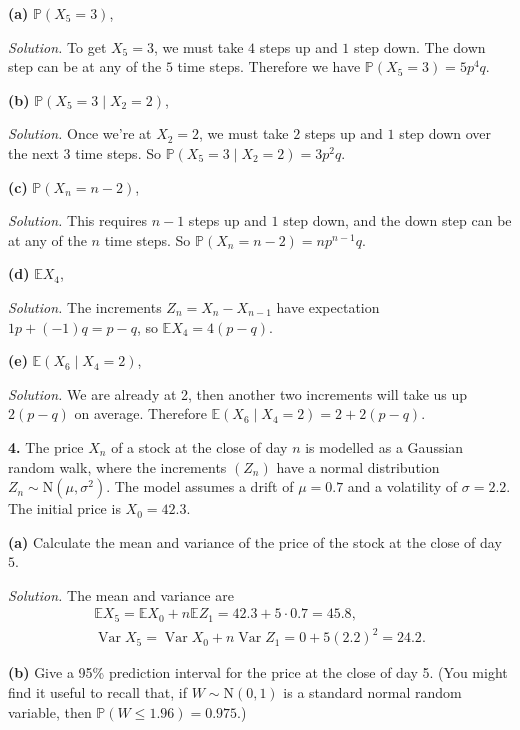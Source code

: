 \documentclass[
  a4paper,
]{article}
\theoremstyle{definition}
\theoremstyle{definition}
\theoremstyle{definition}
\theoremstyle{remark}
\begin{document}
\textbf{(a)} \(\mathbb P(X_5 = 3)\),

\emph{Solution.} To get \(X_5 = 3\), we must take \(4\) steps up and \(1\) step down. The down step can be at any of the \(5\) time steps. Therefore we have \(\mathbb P(X_5 = 3) = 5p^4q\).

\textbf{(b)} \(\mathbb P(X_5 = 3 \mid X_2 = 2)\),

\emph{Solution.} Once we're at \(X_2 = 2\), we must take \(2\) steps up and \(1\) step down over the next \(3\) time steps. So \(\mathbb P(X_5 = 3 \mid X_2 = 2) = 3p^2q\).

\textbf{(c)} \(\mathbb P(X_n = n-2)\),

\emph{Solution.} This requires \(n-1\) steps up and \(1\) step down, and the down step can be at any of the \(n\) time steps. So \(\mathbb P(X_n = n-2) = np^{n-1}q\).

\textbf{(d)} \(\mathbb E X_4\),

\emph{Solution.} The increments \(Z_n = X_n - X_{n-1}\) have expectation \(1p + (-1)q = p - q\), so \(\mathbb E X_4 = 4(p-q)\).

\textbf{(e)} \(\mathbb E(X_6 \mid X_4 = 2)\),

\emph{Solution.} We are already at 2, then another two increments will take us up \(2(p-q)\) on average. Therefore \(\mathbb E(X_6 \mid X_4 = 2) = 2 + 2(p-q)\).

\textbf{4.} The price \(X_n\) of a stock at the close of day \(n\) is modelled as a Gaussian random walk, where the increments \((Z_n)\) have a normal distribution \(Z_n \sim \text{N}(\mu, \sigma^2)\). The model assumes a drift of \(\mu = 0.7\) and a volatility of \(\sigma = 2.2\). The initial price is \(X_0 = 42.3\).

\textbf{(a)} Calculate the mean and variance of the price of the stock at the close of day \(5\).

\emph{Solution.} The mean and variance are
\begin{gather*}
  \mathbb EX_5 = \mathbb E X_0 + n \mathbb E Z_1 = 42.3 + 5 \cdot 0.7 = 45.8 , \\
  \operatorname{Var}X_5 = \operatorname{Var}X_0 + n \operatorname{Var}Z_1 = 0 + 5 (2.2)^2 = 24.2 .
  \end{gather*}

\textbf{(b)} Give a 95\% prediction interval for the price at the close of day 5. (You might find it useful to recall that, if \(W \sim \text{N}(0,1)\) is a standard normal random variable, then \(\mathbb P(W \leq 1.96) = 0.975\).)
\end{document}
